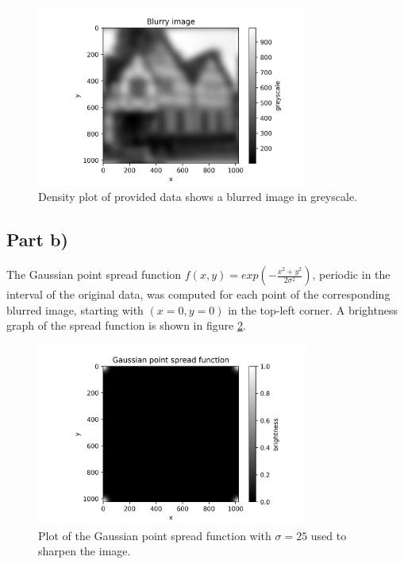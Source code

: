 \documentclass{article}
\begin{document}
\begin{figure}[H]
	\centering
	\includegraphics[width=0.8\textwidth]{../images/blurred_image.png}
	\caption{Density plot of provided data shows a blurred image in greyscale.}
	\label{fig:blurred_image}	
\end{figure}

\subsection{Part b)}
The Gaussian point spread function $f(x,y) = exp(-\frac{x^2+y^2}{2\sigma^2})$, periodic in the interval of the original data, was computed for each point of the corresponding blurred image, starting with $(x=0,y=0)$ in the top-left corner. A brightness graph of the spread function is shown in figure \ref{fig:spread_func}.

\begin{figure}[H]
	\centering
	\includegraphics[width=0.8\textwidth]{../images/spread_function.png}
	\caption{Plot of the Gaussian point spread function with $\sigma=25$ used to sharpen the image.}
	\label{fig:spread_func}	
\end{figure}
\end{document}
